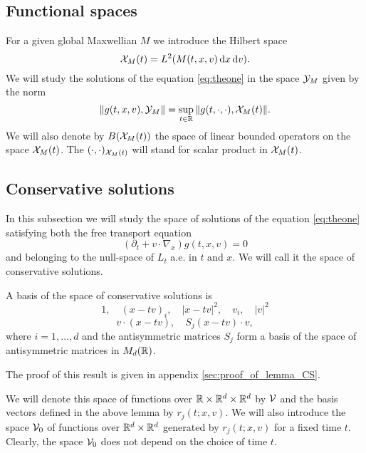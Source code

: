 \subsection{Functional spaces} %
\label{sub:functional_spaces}
For a given global Maxwellian $M$ we introduce the Hilbert space 
\begin{equation}
	\label{eq:Xt}
	{\mathcal X_M(t)}=L^2(M(t,x,v){\,\mathrm{d} x}{\,\mathrm{d} v}).
\end{equation}
We will study the solutions of the equation \eqref{eq:theone} in the space ${\mathcal Y_M}$ given by the norm
\begin{equation}
	\label{eq:Y}
	\|g(t,x,v),{\mathcal Y_M}\|=\sup_{t\in{\mathbb R}}\|g(t,\cdot,\cdot),{\mathcal X_M(t)}\|.
\end{equation}
We will also denote by $B({\mathcal X_M(t)})$ the space of linear bounded operators on the space ${\mathcal X_M(t)}$. The $(\cdot,\cdot)_{{\mathcal X_M(t)}}$ will stand for scalar product in ${\mathcal X_M(t)}$.

\subsection{Conservative solutions} %
\label{sub:conservative_solutions}
In this subsection we will study the space of solutions of the equation \eqref{eq:theone} satisfying both the free transport equation
\[(\partial_t + v\cdot \nabla_x)g(t,x,v)=0\] and belonging to the null-space of $L_t$ a.e. in $t$ and $x$. We will call it the space of conservative solutions.	

\begin{lemma}\label{le:CS}
A basis of the space of conservative solutions is
\[1, \quad (x-tv)_i,\quad |x-tv|^2, \quad v_i,\quad |v|^2\]
\[v\cdot (x-tv),\quad S_j(x-tv)\cdot v,\]where $i=1,\dots, d$ and the antisymmetric matrices $S_j$ form a basis of the space of antisymmetric matrices in $M_d({\mathbb R})$.
\end{lemma}
The proof of this result is given in appendix \ref{sec:proof_of_lemma_CS}.

We will denote this space of functions over ${\mathbb R}\times{{\mathbb R^d}\times{\mathbb R^d}}$ by ${\mathcal V}$ and the basis vectors defined in the above lemma by $r_j(t;x,v)$. We will also introduce the space ${\mathcal V_0}$ of functions over ${{\mathbb R^d}\times{\mathbb R^d}}$ generated by $r_j(t;x,v)$ for a fixed time $t$. Clearly, the space ${\mathcal V_0}$ does not depend on the choice of time $t$.


